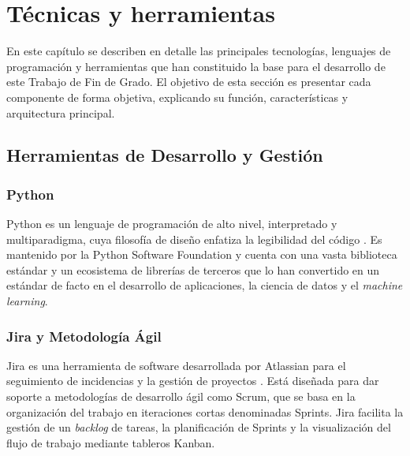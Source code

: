 \chapter{Técnicas y herramientas}
\label{chap:tecnicas_herramientas}

En este capítulo se describen en detalle las principales tecnologías, lenguajes de programación y herramientas que han constituido la base para el desarrollo de este Trabajo de Fin de Grado. El objetivo de esta sección es presentar cada componente de forma objetiva, explicando su función, características y arquitectura principal.

\section{Herramientas de Desarrollo y Gestión}
\label{sec:herramientas_desarrollo}

\subsection{Python}
Python es un lenguaje de programación de alto nivel, interpretado y multiparadigma, cuya filosofía de diseño enfatiza la legibilidad del código \cite{python_software_foundation}. Es mantenido por la Python Software Foundation y cuenta con una vasta biblioteca estándar y un ecosistema de librerías de terceros que lo han convertido en un estándar de facto en el desarrollo de aplicaciones, la ciencia de datos y el \textit{machine learning}.

\subsection{Jira y Metodología Ágil}
Jira es una herramienta de software desarrollada por Atlassian para el seguimiento de incidencias y la gestión de proyectos \cite{atlassian_jira}. Está diseñada para dar soporte a metodologías de desarrollo ágil como Scrum, que se basa en la organización del trabajo en iteraciones cortas denominadas Sprints. Jira facilita la gestión de un \textit{backlog} de tareas, la planificación de Sprints y la visualización del flujo de trabajo mediante tableros Kanban.

